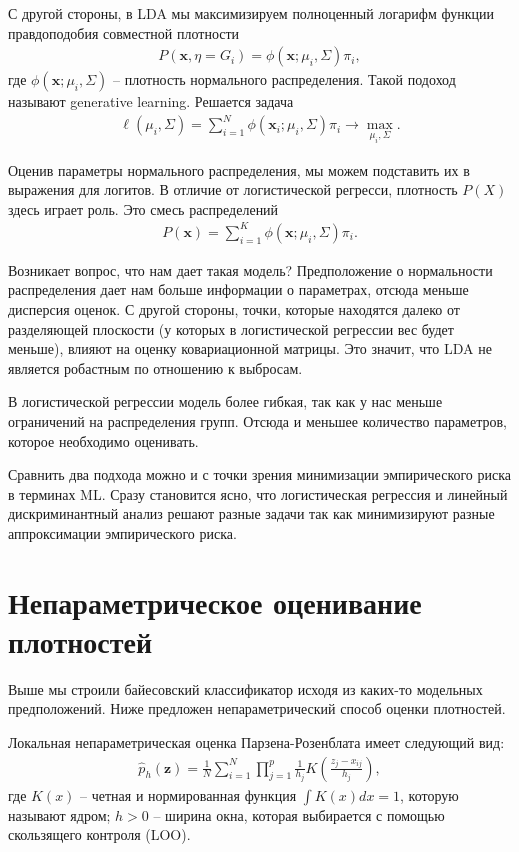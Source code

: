 \documentclass{article}
\begin{document}
 С другой стороны, в LDA мы максимизируем полноценный логарифм функции правдоподобия совместной плотности
 \begin{align*}
   P(\mathbf{x} , \eta = G_i) =  \phi(\mathbf{x}; \mu_i, \Sigma)\pi_i,
 \end{align*}
где $\phi(\mathbf{x}; \mu_i, \Sigma)$  -- плотность нормального распределения. Такой подоход называют generative learning. Решается задача
\begin{align*}
  \ell(\mu_i, \Sigma) = \sum_{i = 1}^{N} \phi(\mathbf{x}_i; \mu_i, \Sigma)\pi_i \rightarrow \max_{\mu_i, \Sigma}.
\end{align*}

Оценив параметры нормального распределения, мы можем подставить их в выражения для логитов. В отличие от логистической регресси, плотность $P(X)$ здесь играет роль. Это смесь распределений
\begin{align*}
  P(\mathbf{x}) =  \sum_{i = 1}^K \phi(\mathbf{x}; \mu_i, \Sigma)\pi_i.
\end{align*}

Возникает вопрос, что нам дает такая модель? Предположение о нормальности распределения дает нам больше информации о параметрах, отсюда меньше дисперсия оценок. С другой стороны, точки, которые находятся далеко от разделяющей плоскости (у которых в логистической регрессии вес будет меньше), влияют на оценку ковариационной матрицы. Это значит, что LDA не является робастным по отношению к выбросам.

В логистической регрессии модель более гибкая, так как у нас меньше ограничений на распределения групп. Отсюда и меньшее количество параметров, которое необходимо оценивать.

Сравнить два подхода можно и с точки зрения минимизации эмпирического риска в терминах ML. Сразу становится ясно, что логистическая регрессия и линейный дискриминантный анализ решают разные задачи так как минимизируют разные аппроксимации эмпирического риска.

\section{Непараметрическое оценивание плотностей}
Выше мы строили байесовский классификатор исходя из каких-то модельных предположений. Ниже предложен непараметрический способ оценки плотностей.

Локальная непараметрическая оценка Парзена-Розенблата имеет следующий вид:
\begin{align*}
   \widehat{p}_h(\mathbf{z}) = \frac{1}{N}\sum_{i = 1}^N \prod_{j = 1}^p \frac{1}{h_j}K \left(\frac{z_j - x_{ij}}{h_j}\right),
\end{align*}
где $K(x)$ -- четная и нормированная функция $\int K(x) dx = 1$, которую называют ядром; $h > 0$ -- ширина окна, которая выбирается с помощью скользящего контроля (LOO).
\end{document}
